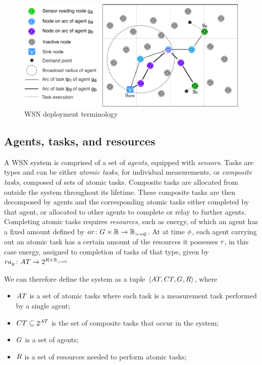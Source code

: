 \newcommand{\formalAgentResources}[2]{
	\functionFormal{ar}
	{\setAgents{}{} \times \setRealNumbers{}{}}
	{\setRealNumbersNonNegative{}{}}
}


\begin{figure}
\centering 
\includegraphics[width=0.9\linewidth, trim={25pt 0pt 24pt 0pt, clip}]{grid_concept}
\caption[WSN deployment terminology]{WSN deployment terminology}
\label{fig:gridconcept}
\end{figure}

\subsection{Agents, tasks, and resources}

A WSN system is comprised of a set of \textit{agents}, equipped with \textit{sensors}. Tasks are types and can be either \textit{atomic tasks}, for individual measurements, or \textit{composite tasks}, composed of sets of atomic tasks. Composite tasks are allocated from outside the system throughout its lifetime. These composite tasks are then decomposed by agents and the corresponding atomic tasks either completed by that agent, or allocated to other agents to complete or relay to further agents. Completing atomic tasks requires \textit{resources}, such as energy, of which an agent has a fixed amount defined by $\formalAgentResources{}{}$. At at time $\phi$, each agent carrying out an atomic task has a certain amount of the resources it possesses $\varResource{}{}$, in this case energy, assigned to completion of tasks of that type, given by $\formalTaskResourceAllocation{}{}$

We can therefore define the system as a tuple $\langle \setAtomicTask{}{}, \setCompositeTask{}{},  \setAgents{}{}, \setResource{}{} \rangle$, where
\begin{itemize}
 \item $\setAtomicTask{}{}$ is a set of atomic tasks where each task is a measurement task performed by a single agent;
 \item $\setCompositeTask{}{} \subseteq \powerSetSymbol{\setAtomicTask{}{}}{}{}$ is the set of composite tasks that occur in the system;
 \item $G_{}^{}$ is a set of agents;
 \item $\setResource{}{}$ is a set of resources needed to perform atomic tasks;
\end{itemize}

